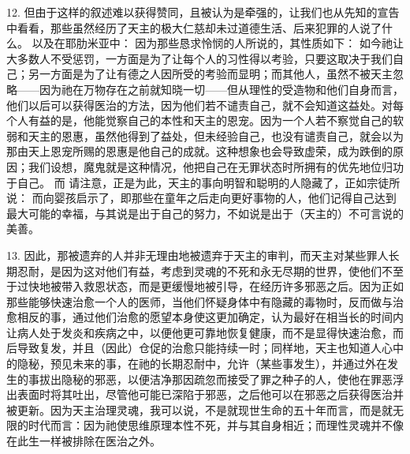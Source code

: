 12. 但由于这样的叙述难以获得赞同，且被认为是牵强的，让我们也从先知的宣告中看看，那些虽然经历了天主的极大仁慈却未过道德生活、后来犯罪的人说了什么。 以及在耶肋米亚中： 因为那些恳求怜悯的人所说的，其性质如下： 如今祂让大多数人不受惩罚，一方面是为了让每个人的习性得以考验，只要这取决于我们自己；另一方面是为了让有德之人因所受的考验而显明；而其他人，虽然不被天主忽略——因为祂在万物存在之前就知晓一切——但从理性的受造物和他们自身而言，他们以后可以获得医治的方法，因为他们若不谴责自己，就不会知道这益处。对每个人有益的是，他能觉察自己的本性和天主的恩宠。因为一个人若不察觉自己的软弱和天主的恩惠，虽然他得到了益处，但未经验自己，也没有谴责自己，就会以为那由天上恩宠所赐的恩惠是他自己的成就。这种想象也会导致虚荣，成为跌倒的原因；我们设想，魔鬼就是这种情况，他把自己在无罪状态时所拥有的优先地位归功于自己。 而 请注意，正是为此，天主的事向明智和聪明的人隐藏了，正如宗徒所说： 而向婴孩启示了，即那些在童年之后走向更好事物的人，他们记得自己达到最大可能的幸福，与其说是出于自己的努力，不如说是出于（天主的）不可言说的美善。\par

13. 因此，那被遗弃的人并非无理由地被遗弃于天主的审判，而天主对某些罪人长期忍耐，是因为这对他们有益，考虑到灵魂的不死和永无尽期的世界，使他们不至于过快地被带入救恩状态，而是更缓慢地被引导，在经历许多邪恶之后。因为正如那些能够快速治愈一个人的医师，当他们怀疑身体中有隐藏的毒物时，反而做与治愈相反的事，通过他们治愈的愿望本身使这更加确定，认为最好在相当长的时间内让病人处于发炎和疾病之中，以便他更可靠地恢复健康，而不是显得快速治愈，而后导致复发，并且（因此）仓促的治愈只能持续一时；同样地，天主也知道人心中的隐秘，预见未来的事，在祂的长期忍耐中，允许（某些事发生），并通过外在发生的事拔出隐秘的邪恶，以便洁净那因疏忽而接受了罪之种子的人，使他在罪恶浮出表面时将其吐出，尽管他可能已深陷于邪恶，之后他可以在邪恶之后获得医治并被更新。因为天主治理灵魂，我可以说，不是就现世生命的五十年而言，而是就无限的时代而言：因为祂使思维原理本性不死，并与其自身相近；而理性灵魂并不像在此生一样被排除在医治之外。\par

